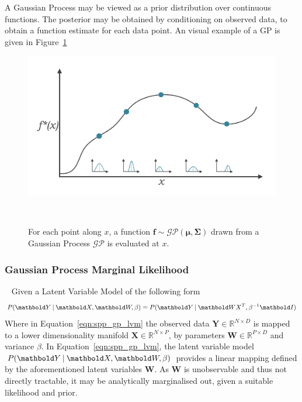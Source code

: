 A Gaussian Process may be viewed as a prior distribution over continuous functions. The posterior 
may be obtained by conditioning on observed data, to obtain a function estimate for each data point.
An visual example of a GP is given in Figure~\ref{figure:gp_func_dist}
\begin{figure}[!htbp]
  \centering
  \includegraphics[width=0.95\linewidth]{figures/spp/gp.pdf}
  \caption[GP as a Distribution Over Functions]{For each point along \( x \), 
  a function \( \bm{f} \sim \mathcal{GP}(\bm{\mu}, \bm{\Sigma}) \) drawn from a Gaussian Process 
  \( \mathcal{GP} \) is evaluated at \( x \).}
~\label{figure:gp_func_dist}
\end{figure}

\subsubsection{Gaussian Process Marginal Likelihood}
~\label{subsubsec:spp_gp_marginal_likelihood}
Given a Latent Variable Model of the following form
\begin{equation}
  \label{eqn:spp_gp_lvm}
  P(\bm{Y} \given \bm{X}, \bm{W}, \beta) = P(\bm{Y} \given \bm{WX}^{T}, \beta^{-1}\bm{I})
\end{equation}
Where in Equation~\ref{eqn:spp_gp_lvm} the observed data \(\bm{Y} \in \mathbb{R}^{N \times D}\) 
is mapped to a lower dimensionality manifold \(\bm{X} \in \mathbb{R}^{N \times P}\), by parameters 
\(\bm{W} \in \mathbb{R}^{P \times D}\) and variance \( \beta \). In Equation~\ref{eqn:spp_gp_lvm}, 
the latent variable model \( P(\bm{Y} \given \bm{X}, \bm{W}, \beta) \) provides a linear mapping 
defined by the aforementioned latent variables \( \bm{W} \). As \( \bm{W} \) is unobservable and 
thus not directly tractable, it may be analytically marginalised out, given a suitable likelihood 
and prior.

